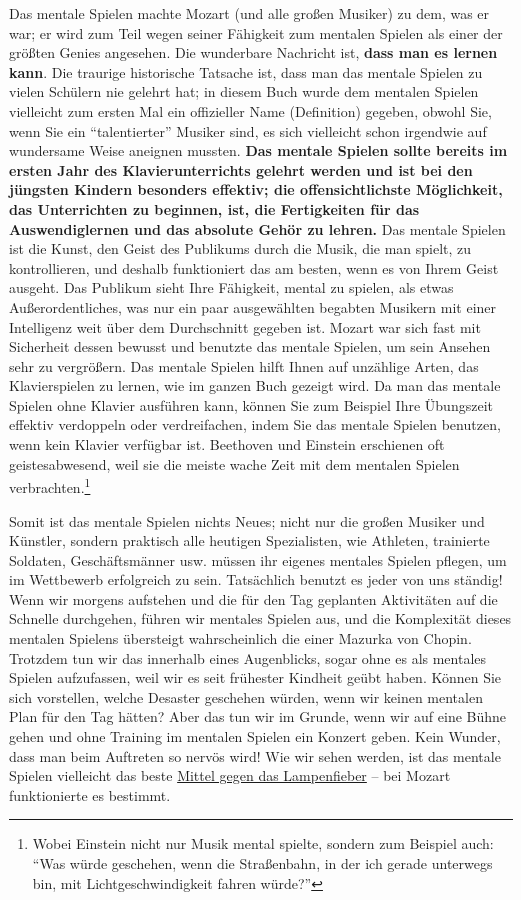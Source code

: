 Das mentale Spielen machte Mozart (und alle großen Musiker) zu dem, was er war; er wird zum Teil wegen seiner Fähigkeit zum mentalen Spielen als einer der größten Genies angesehen.
Die wunderbare Nachricht ist, \textbf{dass man es lernen kann}.
Die traurige historische Tatsache ist, dass man das mentale Spielen zu vielen Schülern nie gelehrt hat;
in diesem Buch wurde dem mentalen Spielen vielleicht zum ersten Mal ein offizieller Name (Definition) gegeben, obwohl Sie, wenn Sie ein \enquote{talentierter} Musiker sind, es sich vielleicht schon irgendwie auf wundersame Weise aneignen mussten.
\textbf{Das mentale Spielen sollte bereits im ersten Jahr des Klavierunterrichts gelehrt werden und ist bei den jüngsten Kindern besonders effektiv;
die offensichtlichste Möglichkeit, das Unterrichten zu beginnen, ist, die Fertigkeiten für das Auswendiglernen und das absolute Gehör zu lehren.}
Das mentale Spielen ist die Kunst, den Geist des Publikums durch die Musik, die man spielt, zu kontrollieren, und deshalb funktioniert das am besten, wenn es von Ihrem Geist ausgeht.
Das Publikum sieht Ihre Fähigkeit, mental zu spielen, als etwas 
Außerordentliches, was nur ein paar ausgewählten begabten Musikern mit einer Intelligenz weit über dem Durchschnitt gegeben ist.
Mozart war sich fast mit Sicherheit dessen bewusst und benutzte das mentale Spielen, um sein Ansehen sehr zu vergrößern.
Das mentale Spielen hilft Ihnen auf unzählige Arten, das Klavierspielen zu lernen, wie im ganzen Buch gezeigt wird.
Da man das mentale Spielen ohne Klavier ausführen kann, können Sie zum Beispiel Ihre Übungszeit effektiv verdoppeln oder verdreifachen, 
indem Sie das mentale Spielen benutzen, wenn kein Klavier verfügbar ist.
Beethoven und Einstein erschienen oft geistesabwesend, weil sie die meiste wache Zeit mit dem mentalen Spielen verbrachten.\footnote{Wobei Einstein nicht nur Musik mental spielte, sondern zum Beispiel auch: \enquote{Was würde geschehen, wenn die Straßenbahn, in der ich gerade unterwegs bin, mit Lichtgeschwindigkeit fahren würde?}}

Somit ist das mentale Spielen nichts Neues;
nicht nur die großen Musiker und Künstler, sondern praktisch alle heutigen Spezialisten, wie Athleten, trainierte Soldaten, Geschäftsmänner usw. müssen ihr eigenes mentales Spielen pflegen, um im Wettbewerb erfolgreich zu sein.
Tatsächlich benutzt es jeder von uns ständig!
Wenn wir morgens aufstehen und die für den Tag geplanten Aktivitäten auf die Schnelle durchgehen, führen wir mentales Spielen aus, und die Komplexität dieses mentalen Spielens übersteigt wahrscheinlich die einer Mazurka von Chopin.
Trotzdem tun wir das innerhalb eines Augenblicks, sogar ohne es als mentales Spielen aufzufassen, weil wir es seit frühester Kindheit geübt haben.
Können Sie sich vorstellen, welche Desaster geschehen würden, wenn wir keinen mentalen Plan für den Tag hätten?
Aber das tun wir im Grunde, wenn wir auf eine Bühne gehen und ohne Training im mentalen Spielen ein Konzert geben.
Kein Wunder, dass man beim Auftreten so nervös wird!
Wie wir sehen werden, ist das mentale Spielen vielleicht das beste \hyperref[c1iii15]{Mittel gegen das Lampenfieber} -- bei Mozart funktionierte es bestimmt.


